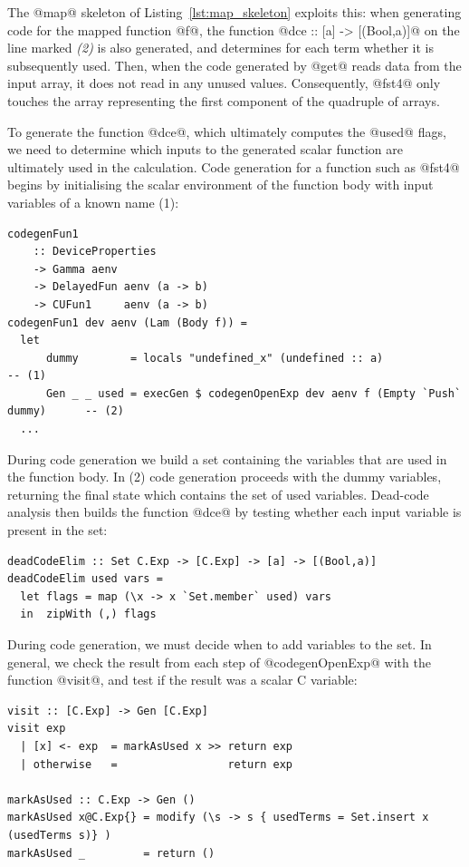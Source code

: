 The @map@ skeleton of Listing~\ref{lst:map_skeleton} exploits this: when
generating code for the mapped function @f@, the function
@dce :: [a] -> [(Bool,a)]@
on the line marked \emph{(2)} is also generated, and determines for each term
whether it is subsequently used. Then, when the code generated by @get@ reads
data from the input array, it does not read in any unused values. Consequently,
@fst4@ only touches the array representing the first component of the quadruple
of arrays.

To generate the function @dce@, which ultimately computes the @used@ flags, we
need to determine which inputs to the generated scalar function are ultimately
used in the calculation. Code generation for a function such as @fst4@ begins by
initialising the scalar environment of the function body with input variables of
a known name (1):
%
\begin{lstlisting}[style=haskell]
codegenFun1
    :: DeviceProperties
    -> Gamma aenv
    -> DelayedFun aenv (a -> b)
    -> CUFun1     aenv (a -> b)
codegenFun1 dev aenv (Lam (Body f)) =
  let
      dummy        = locals "undefined_x" (undefined :: a)                         -- (1)
      Gen _ _ used = execGen $ codegenOpenExp dev aenv f (Empty `Push` dummy)      -- (2)
  ...
\end{lstlisting}
%
During code generation we build a set containing the variables that are used in
the function body. In (2) code generation proceeds with the dummy variables,
returning the final state which contains the set of used variables. Dead-code
analysis then builds the function @dce@ by testing whether each input variable
is present in the set:
%
\begin{lstlisting}[style=haskell]
deadCodeElim :: Set C.Exp -> [C.Exp] -> [a] -> [(Bool,a)]
deadCodeElim used vars =
  let flags = map (\x -> x `Set.member` used) vars
  in  zipWith (,) flags
\end{lstlisting}

During code generation, we must decide when to add variables to the set. In
general, we check the result from each step of @codegenOpenExp@ with the
function @visit@, and test if the result was a scalar C variable:
%
\begin{lstlisting}[style=haskell]
visit :: [C.Exp] -> Gen [C.Exp]
visit exp
  | [x] <- exp  = markAsUsed x >> return exp
  | otherwise   =                 return exp

markAsUsed :: C.Exp -> Gen ()
markAsUsed x@C.Exp{} = modify (\s -> s { usedTerms = Set.insert x (usedTerms s)} )
markAsUsed _         = return ()
\end{lstlisting}


